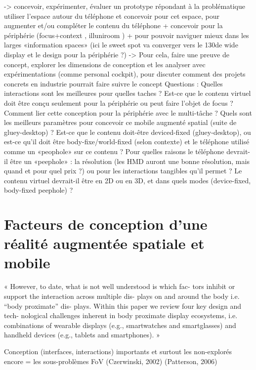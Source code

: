 -> concevoir, expérimenter, évaluer un prototype répondant à la problématique
utiliser l'espace autour du téléphone et concevoir pour cet espace, pour augmenter et/ou compléter le contenu du téléphone 
+ concevoir pour la périphérie (focus+context \cite{CockburnKarlsonBederson2009}, illuniroom \cite{JonesBenkoOfekEtAl2013}) 
+ pour pouvoir naviguer mieux dans les larges «information spaces» \cite{RaedleJetterMuellerEtAl2014} (ici le sweet spot va converger vers le 130\textdegree de wide display et le design pour la périphérie ?) -> Pour cela, faire une preuve de concept, explorer les dimensions de conception et les analyser avec expérimentations (comme personal cockpit), pour discuter comment des projets concrets en industrie pourrait faire suivre le concept
Questions : Quelles interactions sont les meilleures pour quelles taches ? Est-ce que le contenu virtuel doit être conçu seulement pour la périphérie ou peut faire l'objet de focus ? Comment lier cette conception pour la périphérie avec le multi-tâche ? Quels sont les meilleurs paramètres pour concevoir ce mobile augmenté spatial (suite de gluey-desktop) ? Est-ce que le contenu doit-être deviced-fixed (gluey-desktop), ou est-ce qu'il doit être body-fixe/world-fixed (selon contexte) et le téléphone utilisé comme un «peophole» sur ce contenu ? Pour quelles raisons le téléphone devrait-il être un «peephole» : la résolution (les HMD auront une bonne résolution, mais quand et pour quel prix ?) ou pour les interactions tangibles qu'il permet ? Le contenu virtuel devrait-il être en 2D ou en 3D, et dans quels modes (device-fixed, body-fixed peephole) ? 

\section*{Facteurs de conception d'une réalité augmentée spatiale et mobile}
« However, to date, what is not well understood is which fac-
tors inhibit or support the interaction across multiple dis-
plays on and around the body i.e. “body proximate” dis-
plays. Within this paper we review four key design and tech-
nological challenges inherent in body proximate display
ecosystems, i.e. combinations of wearable displays (e.g.,
smartwatches and smartglasses) and handheld devices
(e.g., tablets and smartphones). » \cite{GrubertKranzQuigley2015} %

Conception (interfaces, interactions) importants et surtout les non-explorés encore = les sous-problèmes
        FoV (Czerwinski, 2002) (Patterson, 2006) \cite{KishishitaKiyokawaOrloskyEtAl2014} 

